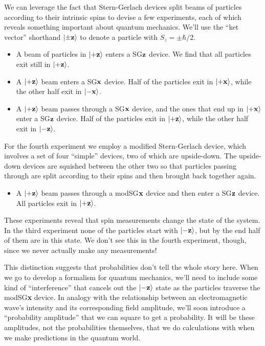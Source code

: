 \documentclass[../p116main.tex]{subfiles}
\begin{document}
We can leverage the fact that Stern-Gerlach devices split beams of particles according to their intrinsic spins to devise a few experiments, each of which reveals something important about quantum mechanics.
We'll use the ``ket vector'' shorthand $\left| \pm \mathbf{z} \right>$ to denote a particle with $S_z = \pm \hbar / 2$.
\begin{itemize}[topsep=0pt]
    \item A beam of particles in $\left| +\mathbf{z} \right>$ enters a SG$\mathbf{z}$ device.
    We find that all particles exit still in $\left| +\mathbf{z} \right>$.

    \item A $\left| +\mathbf{z} \right>$ beam enters a SG$\mathbf{x}$ device.
    Half of the particles exit in $\left| +\mathbf{x} \right>$, while the other half exit in $\left| -\mathbf{x} \right>$.

    \item A $\left| +\mathbf{z} \right>$ beam passes through a SG$\mathbf{x}$ device, and the ones that end up in $\left| +\mathbf{x} \right>$ enter a SG$\mathbf{z}$ device.
    Half of the particles exit in $\left| +\mathbf{z} \right>$, while the other half exit in $\left| -\mathbf{z} \right>$.
\end{itemize}
For the fourth experiment we employ a modified Stern-Gerlach device, which involves a set of four ``simple'' devices, two of which are upside-down.
The upside-down devices are squished between the other two so that particles passing through are split according to their spins and then brought back together again.
\begin{itemize}[topsep=0pt]
    \item A $\left| +\mathbf{z} \right>$ beam passes through a modSG$\mathbf{x}$ device and then enter a SG$\mathbf{z}$ device.
    All particles exit in $\left| +\mathbf{z} \right>$.
\end{itemize}
These experiments reveal that spin measurements change the state of the system.
In the third experiment none of the particles start with $\left| -\mathbf{z} \right>$, but by the end half of them are in this state.
We don't see this in the fourth experiment, though, since we never actually make any measurements!

This distinction suggests that probabilities don't tell the whole story here.
When we go to develop a formalism for quantum mechanics, we'll need to include some kind of ``interference'' that cancels out the $\left| -\mathbf{z} \right>$ state as the particles traverse the modSG\textbf{x} device.
In analogy with the relationship between an electromagnetic wave's intensity and its corresponding field amplitude, we'll soon introduce a ``probability amplitude'' that we can square to get a probability.
It will be these amplitudes, not the probabilities themselves, that we do calculations with when we make predictions in the quantum world.
\end{document}
